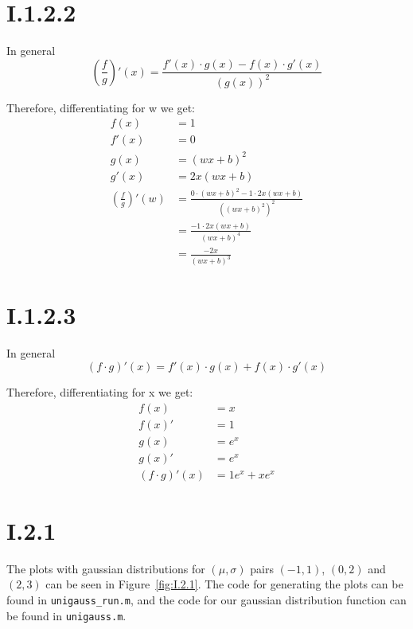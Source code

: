 \section*{I.1.2.2}
In general
\[
	\left ( \frac{f}{g} \right )' (x) = \frac{f'(x) \cdot g(x) - f(x) \cdot g'(x)}{(g(x))^2}
\]

Therefore, differentiating for w we get:
\begin{align*}
	f(x) &= 1 \\
	f'(x) &= 0 \\
	g(x) &= (wx+b)^2 \\
	g'(x) &= 2x(wx+b) \\
	\left ( \frac{f}{g} \right )' (w) &= \frac{0 \cdot (wx+b)^2 - 1 \cdot 2x(wx+b)}{((wx+b)^2)^2} \\
	&= \frac{-1 \cdot 2x(wx+b)}{(wx+b)^4} \\
	&= \frac{-2x}{(wx+b)^3}
\end{align*}

\section*{I.1.2.3}
In general
\[
	\left ( f \cdot g \right )' (x) = f'(x) \cdot g(x) + f(x) \cdot g'(x)
\]

Therefore, differentiating for x we get:
\begin{align*}
	f(x) &= x \\
	f(x)' &= 1 \\
	g(x) &= e^x \\
	g(x)' &= e^x \\
	\left ( f \cdot g \right )' (x) &= 1e^x + xe^x
\end{align*}

\pagebreak
\section*{I.2.1}
The plots with gaussian distributions for $(\mu,\sigma)$ pairs $(-1,1)$, $(0,2)$ and
$(2,3)$ can be seen in Figure~\ref{fig:I.2.1}. The code for generating the plots
can be found in \texttt{unigauss\_run.m}, and the code for our gaussian
distribution function can be found in \texttt{unigauss.m}.


